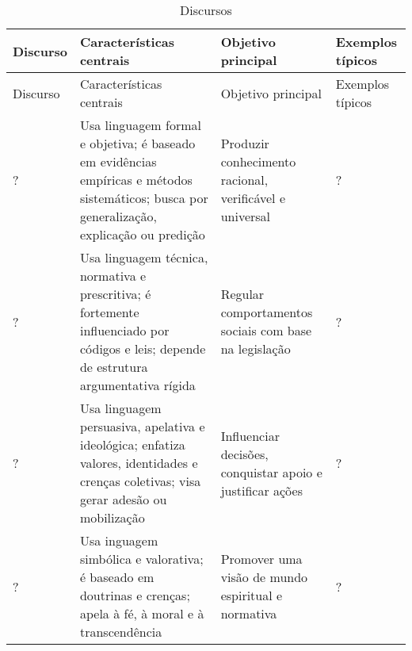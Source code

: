 \documentclass[
  letterpaper,
  DIV=11,
  numbers=noendperiod]{scrreprt}
\begin{document}
\begin{longtable}[]{@{}
  >{\raggedright\arraybackslash}p{}
  >{\raggedright\arraybackslash}p{}
  >{\raggedright\arraybackslash}p{}
  >{\raggedright\arraybackslash}p{}@{}}
\caption{Discursos}\tabularnewline
\toprule\noalign{}
\begin{minipage}[b]{\linewidth}\raggedright
Discurso
\end{minipage} & \begin{minipage}[b]{\linewidth}\raggedright
Características centrais
\end{minipage} & \begin{minipage}[b]{\linewidth}\raggedright
Objetivo principal
\end{minipage} & \begin{minipage}[b]{\linewidth}\raggedright
Exemplos típicos
\end{minipage} \\
\midrule\noalign{}
\endfirsthead
\toprule\noalign{}
\begin{minipage}[b]{\linewidth}\raggedright
Discurso
\end{minipage} & \begin{minipage}[b]{\linewidth}\raggedright
Características centrais
\end{minipage} & \begin{minipage}[b]{\linewidth}\raggedright
Objetivo principal
\end{minipage} & \begin{minipage}[b]{\linewidth}\raggedright
Exemplos típicos
\end{minipage} \\
\midrule\noalign{}
\endhead
\bottomrule\noalign{}
\endlastfoot
? & Usa linguagem formal e objetiva; é baseado em evidências empíricas e
métodos sistemáticos; busca por generalização, explicação ou predição &
Produzir conhecimento racional, verificável e universal & ? \\
? & Usa linguagem técnica, normativa e prescritiva; é fortemente
influenciado por códigos e leis; depende de estrutura argumentativa
rígida & Regular comportamentos sociais com base na legislação & ? \\
? & Usa linguagem persuasiva, apelativa e ideológica; enfatiza valores,
identidades e crenças coletivas; visa gerar adesão ou mobilização &
Influenciar decisões, conquistar apoio e justificar ações & ? \\
? & Usa inguagem simbólica e valorativa; é baseado em doutrinas e
crenças; apela à fé, à moral e à transcendência & Promover uma visão de
mundo espiritual e normativa & ? \\
\end{longtable}
\end{document}
